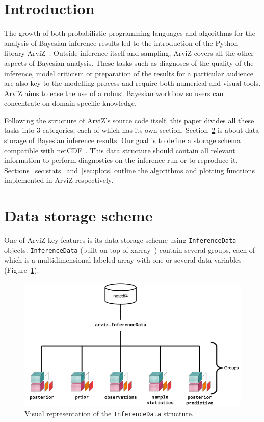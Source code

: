 \documentclass[anonymous=false, %
               format=acmsmall, %
               review=true, %
               screen=true, %
               nonacm=true]{acmart}
\begin{document}
\section{Introduction}
The growth of both probabilistic programming languages and algorithms for the
analysis of Bayesian inference results led to the introduction of the Python
library ArviZ~\cite{arviz2019}. Outside inference itself and sampling, ArviZ covers
all the other aspects of Bayesian analysis. These tasks such as diagnoses of
the quality of the inference, model criticism or preparation of the results
for a particular audience are also key to the modelling process and
require both numerical and visual tools. ArviZ aims to
ease the use of a robust
Bayesian workflow so users can concentrate on domain
specific knowledge.

Following the structure of ArviZ's source code itself, this
paper divides all these tasks into 3 categories, each of which has its own
section. Section~\ref{sec:data} is about data storage of Bayesian inference
results. Our goal is to define a storage schema compatible with
netCDF~\cite{unidata2011network}. This data structure should contain all
relevant information to
perform diagnostics on the inference run or to reproduce it.
Sections~\ref{sec:stats}~and~\ref{sec:plots} outline the algorithms and
plotting functions implemented in ArviZ respectively.

\section{Data storage scheme}\label{sec:data}
One of ArviZ key features is its data storage scheme using
\texttt{InferenceData} objects. \texttt{InferenceData} (built on
top of xarray~\cite{hoyer2017xarray}) contain several groups, each of which is
a multidimensional labeled array with one or several data variables
(Figure~\ref{fig:data}).

\begin{figure}[!hbt]
  \centering
  \includegraphics[width=0.6\linewidth]{InferenceDataStructure.png}
  \caption{Visual representation of the \texttt{InferenceData}
  structure.}\label{fig:data}
\end{figure}
\end{document}
